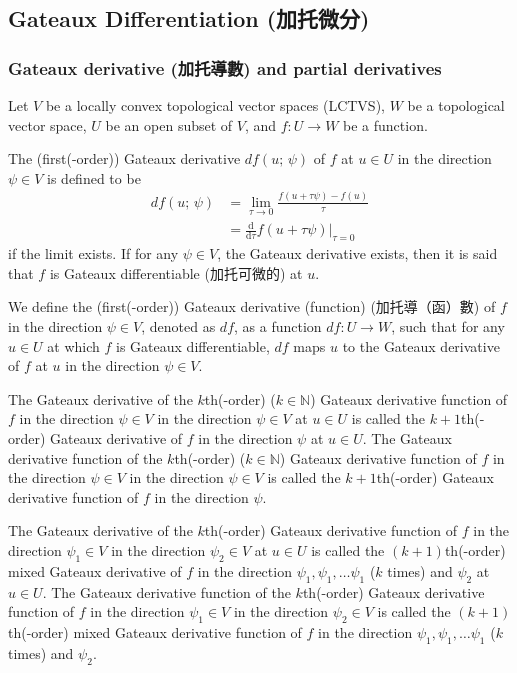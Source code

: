 \subsection{Gateaux Differentiation (加托微分)}
\subsubsection{Gateaux derivative (加托導數) and partial derivatives}
Let $V$ be a locally convex topological vector spaces (LCTVS), $W$ be a topological vector space, $U$ be an open subset of $V$, and $f\colon U\to W$ be a function.

The (first(-order)) Gateaux derivative $df(u;\,\psi)$ of $f$ at $u\in U$ in the direction $\psi \in V$ is defined to be
\[\begin{aligned}
df(u;\,\psi) &= \lim_{\tau\to 0}\frac{f(u+\tau \psi)-f(u)}{\tau}\\
&= \frac{\mathrm{d}}{\mathrm{d}\tau}f(u+\tau \psi)\big\vert_{\tau =0}
\end{aligned}\]
if the limit exists. If for any $\psi \in V$, the Gateaux derivative exists, then it is said that $f$ is Gateaux differentiable (加托可微的) at $u$.

We define the (first(-order)) Gateaux derivative (function) (加托導（函）數) of $f$ in the direction $\psi \in V$, denoted as $df$, as a function $df\colon U\to W$, such that for any $u\in U$ at which $f$ is Gateaux differentiable, $df$ maps $u$ to the Gateaux derivative of $f$ at $u$ in the direction $\psi \in V$.

The Gateaux derivative of the $k$th(-order) ($k\in\mathbb{N}$) Gateaux derivative function of $f$ in the direction $\psi \in V$ in the direction $\psi \in V$ at $u\in U$ is called the $k+1$th(-order) Gateaux derivative of $f$ in the direction $\psi$ at $u\in U$. The Gateaux derivative function of the $k$th(-order) ($k\in\mathbb{N}$) Gateaux derivative function of $f$ in the direction $\psi \in V$ in the direction $\psi \in V$ is called the $k+1$th(-order) Gateaux derivative function of $f$ in the direction $\psi$.

The Gateaux derivative of the $k$th(-order) Gateaux derivative function of $f$ in the direction $\psi_1\in V$ in the direction $\psi_2\in V$ at $u\in U$ is called the $(k+1)$th(-order) mixed Gateaux derivative of $f$ in the direction $\psi_1,\psi_1,\dots \psi_1$ ($k$ times) and $\psi_2$ at $u\in U$. The Gateaux derivative function of the $k$th(-order) Gateaux derivative function of $f$ in the direction $\psi_1\in V$ in the direction $\psi_2\in V$ is called the $(k+1)$th(-order) mixed Gateaux derivative function of $f$ in the direction $\psi_1,\psi_1,\dots \psi_1$ ($k$ times) and $\psi_2$.

